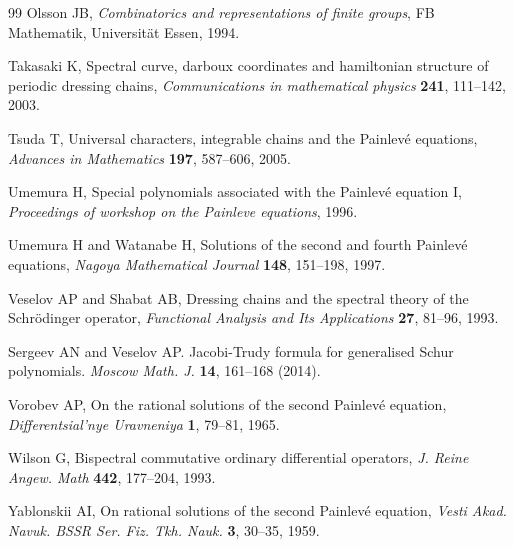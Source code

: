 \documentclass{amsart}
\theoremstyle{definition}
\begin{document}
\begin{thebibliography}{99}
Olsson JB,
\textit{Combinatorics and representations of finite groups}, FB Mathematik,
Universit{\"a}t Essen, 1994.

 Takasaki K, {Spectral curve, darboux
    coordinates and hamiltonian structure of periodic dressing
    chains}, \textit{Communications in mathematical physics}
  \textbf{241}, 111--142, 2003.

 Tsuda T, {Universal characters,
    integrable chains and the Painlev{\'e} equations},
  \textit{Advances in Mathematics} \textbf{197}, 587--606, 2005.

 Umemura H, {Special polynomials
    associated with the Painlev{\'e} equation I}, \textit{Proceedings
    of workshop on the Painleve equations}, 1996.

 Umemura H and Watanabe H, {Solutions of
    the second and fourth Painlev{\'e} equations}, \textit{Nagoya
    Mathematical Journal} \textbf{148}, 151--198, 1997.

 Veselov AP and Shabat AB, {Dressing
    chains and the spectral theory of the Schr{\"o}dinger operator},
  \textit{Functional Analysis and Its Applications} \textbf{27},
  81--96, 1993.

  
 Sergeev AN and Veselov AP. {Jacobi-Trudy
    formula for generalised Schur polynomials.}
\textit{Moscow Math. J.} \textbf{14}, 161–168 (2014).

 Vorobev AP, {On the rational solutions of
    the second Painlev{\'e} equation}, \textit{Differentsial'nye
    Uravneniya} \textbf{1}, 79--81, 1965.

 Wilson G, {Bispectral commutative
    ordinary differential operators}, \textit{J. Reine Angew. Math}
  \textbf{442}, 177--204, 1993.

 Yablonskii AI, {{On rational
      solutions of the second Painlev{\'e} equation}}, \textit{Vesti
    Akad. Navuk. BSSR Ser. Fiz. Tkh. Nauk.} \textbf{3}, 30--35, 1959.

\end{thebibliography}
\end{document}
